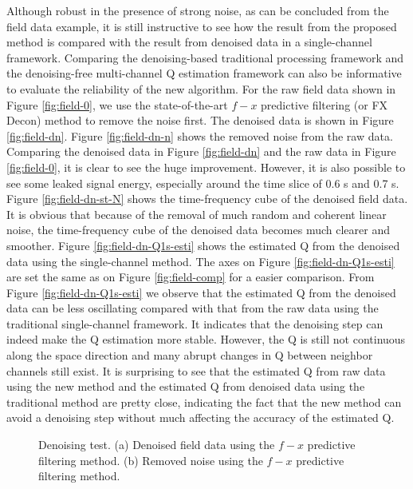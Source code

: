 Although robust in the presence of strong noise, as can be concluded from the field data example, it is still instructive to see how the result from the proposed method is compared with the result from denoised data in a single-channel framework. Comparing the denoising-based traditional processing framework and the denoising-free multi-channel Q estimation framework can also be informative to evaluate the reliability of the new algorithm. For the raw field data shown in Figure \ref{fig:field-0}, we use the state-of-the-art $f-x$ predictive filtering (or FX Decon) method \cite[]{canales1984} to remove the noise first. The denoised data is shown in Figure \ref{fig:field-dn}. Figure \ref{fig:field-dn-n} shows the removed noise from the raw data.
Comparing the denoised data in Figure \ref{fig:field-dn} and the raw data in Figure \ref{fig:field-0}, it is clear to see the huge improvement. However, it is also possible to see some leaked signal energy, especially around the time slice of 0.6 s and 0.7 s. Figure \ref{fig:field-dn-st-N} shows the time-frequency cube of the denoised field data. It is obvious that because of the removal of much random and coherent linear noise, the time-frequency cube of the denoised data becomes much clearer and smoother. Figure \ref{fig:field-dn-Q1s-esti} shows the estimated Q from the denoised data using the single-channel method. The axes on Figure \ref{fig:field-dn-Q1s-esti} are set the same as on Figure \ref{fig:field-comp} for a easier comparison. From Figure \ref{fig:field-dn-Q1s-esti} we observe that the estimated Q from the denoised data can be less oscillating compared with that from the raw data using the traditional single-channel framework. It indicates that the denoising step can indeed make the Q estimation more stable. However, the Q is still not continuous along the space direction and many abrupt changes in Q between neighbor channels still exist. It is surprising to see that the estimated Q from raw data using the new method and the estimated Q from denoised data using the traditional method are pretty close, indicating the fact that the new method can avoid a denoising step without much affecting the accuracy of the estimated Q. 


\begin{figure}[htb!]
	\centering
	\caption{Denoising test. (a) Denoised field data using the $f-x$ predictive filtering method. (b) Removed noise using the $f-x$ predictive filtering method.}
	\label{fig:field-dn,field-dn-n}
\end{figure}


